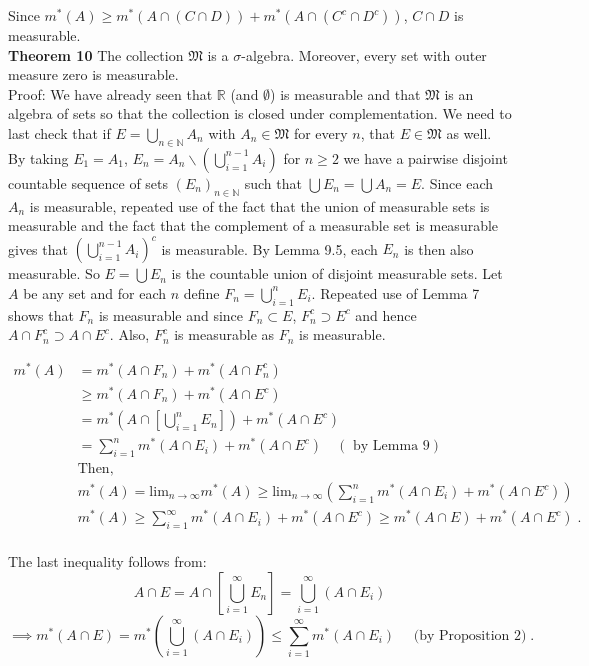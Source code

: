 \documentclass[a4paper]{article}
\begin{document}
Since $m^*(A) \geq m^*(A\cap (C \cap D))+ m^*(A\cap (C^c\cap D^c))$, $C\cap D$ is measurable.\\

{\bf Theorem 10} The collection $\mathfrak{M}$ is a $\sigma$-algebra. Moreover, every set with outer measure zero is measurable.\\

Proof: We have already seen that $\mathbb{R}$ (and $\emptyset$) is measurable and that $\mathfrak{M}$ is an algebra of sets so that the collection is closed under complementation. We need to last check that if $E = \bigcup_{n \in \mathbb{N}} A_n$ with $A_n \in \mathfrak{M}$ for every $n$, that $E \in \mathfrak{M}$ as well. By taking $E_1 = A_1$, $E_n = A_n \backslash \left(\bigcup_{i=1}^{n-1} A_i\right)$ for $n \geq 2$ we have a pairwise disjoint countable sequence of sets $(E_n)_{n \in \mathbb{N}}$ such that $\bigcup E_n = \bigcup A_n = E$. Since each $A_n$ is measurable, repeated use of the fact that the union of measurable sets is measurable and the fact that the complement of a measurable set is measurable gives that $\left(\bigcup_{i=1}^{n-1} A_i \right)^c$ is measurable. By Lemma 9.5, each $E_n$ is then also measurable. So $E = \bigcup E_n$ is the countable union of disjoint measurable sets. Let $A$ be any set and for each $n$ define $F_n = \bigcup_{i = 1}^n E_i$. Repeated use of Lemma 7 shows that $F_n$ is measurable and since $F_n \subset E$, $F_n^c \supset E^c$ and hence $A \cap F_n^c \supset A \cap E^c$. Also, $F_n^c$ is measurable as $F_n$ is measurable.

\begin{align*}
m^*(A) &= m^*(A \cap F_n) + m^*(A \cap F_n^c) \\
&\geq  m^*(A \cap F_n) + m^*(A \cap E^c)\\
&= m^*\left(A \cap \left[\bigcup_{i=1}^n E_n\right]\right) + m^*(A\cap E^c) \\
&= \sum_{i=1}^n m^*(A\cap E_i) + m^*(A\cap E^c) \quad (\text{ by Lemma 9})\\
&\text{Then,}\\
&m^*(A) = \text{lim}_{n\rightarrow \infty} m^*(A) \geq \text{lim}_{n\rightarrow \infty} \left(\sum_{i=1}^n m^*(A\cap E_i) + m^*(A\cap E^c)\right)\\
& m^*(A) \geq \sum_{i=1}^\infty m^*(A\cap E_i) + m^*(A\cap E^c) \geq m^*(A \cap E) + m^*(A \cap E^c) \;.\\
\end{align*}


The last inequality follows from:
$$A \cap E = A \cap \left[\bigcup_{i=1}^\infty E_n \right] = \bigcup_{i=1}^\infty \left(A \cap E_i\right)$$
$$\implies m^*(A\cap E) = m^*\left( \bigcup_{i=1}^\infty \left(A \cap E_i\right)\right) \leq \sum_{i = 1}^\infty m^*(A \cap E_i) \quad \text{ (by Proposition 2)}\;.$$
\end{document}
